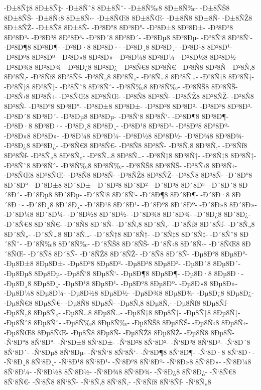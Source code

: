 {-Ð±8Ñ‡8
8Ð±8Ñ‡-
-Ð±8Ñˆ8
8Ð±8Ñˆ-
-Ð±8Ñ‰8
8Ð±8Ñ‰-
-Ð±8ÑŠ8
8Ð±8ÑŠ-
-Ð±8Ñ‹8
8Ð±8Ñ‹-
-Ð±8ÑŒ8
8Ð±8ÑŒ-
-Ð±8Ñ8
8Ð±8Ñ-
-Ð±8ÑŽ8
8Ð±8ÑŽ-
-Ð±8Ñ8
8Ð±8Ñ-
-Ð²8Ð°8
8Ð²8Ð°-
-Ð²8Ð±8
8Ð²8Ð±-
-Ð²8Ð²8
8Ð²8Ð²-
-Ð²8Ð³8
8Ð²8Ð³-
-Ð²8Ð´8
8Ð²8Ð´-
-Ð²8Ðµ8
8Ð²8Ðµ-
-Ð²8Ñ‘8
8Ð²8Ñ‘-
-Ð²8Ð¶8
8Ð²8Ð¶-
-Ð²8Ð·8
8Ð²8Ð·-
-Ð²8Ð¸8
8Ð²8Ð¸-
-Ð²8Ð¹8
8Ð²8Ð¹-
-Ð²8Ðº8
8Ð²8Ðº-
-Ð²8Ð»8
8Ð²8Ð»-
-Ð²8Ð¼8
8Ð²8Ð¼-
-Ð²8Ð½8
8Ð²8Ð½-
-Ð²8Ð¾8
8Ð²8Ð¾-
-Ð²8Ð¿8
8Ð²8Ð¿-
-Ð²8Ñ€8
8Ð²8Ñ€-
-Ð²8Ñ8
8Ð²8Ñ-
-Ð²8Ñ‚8
8Ð²8Ñ‚-
-Ð²8Ñƒ8
8Ð²8Ñƒ-
-Ð²8Ñ„8
8Ð²8Ñ„-
-Ð²8Ñ…8
8Ð²8Ñ…-
-Ð²8Ñ†8
8Ð²8Ñ†-
-Ð²8Ñ‡8
8Ð²8Ñ‡-
-Ð²8Ñˆ8
8Ð²8Ñˆ-
-Ð²8Ñ‰8
8Ð²8Ñ‰-
-Ð²8ÑŠ8
8Ð²8ÑŠ-
-Ð²8Ñ‹8
8Ð²8Ñ‹-
-Ð²8ÑŒ8
8Ð²8ÑŒ-
-Ð²8Ñ8
8Ð²8Ñ-
-Ð²8ÑŽ8
8Ð²8ÑŽ-
-Ð²8Ñ8
8Ð²8Ñ-
-Ð³8Ð°8
8Ð³8Ð°-
-Ð³8Ð±8
8Ð³8Ð±-
-Ð³8Ð²8
8Ð³8Ð²-
-Ð³8Ð³8
8Ð³8Ð³-
-Ð³8Ð´8
8Ð³8Ð´-
-Ð³8Ðµ8
8Ð³8Ðµ-
-Ð³8Ñ‘8
8Ð³8Ñ‘-
-Ð³8Ð¶8
8Ð³8Ð¶-
-Ð³8Ð·8
8Ð³8Ð·-
-Ð³8Ð¸8
8Ð³8Ð¸-
-Ð³8Ð¹8
8Ð³8Ð¹-
-Ð³8Ðº8
8Ð³8Ðº-
-Ð³8Ð»8
8Ð³8Ð»-
-Ð³8Ð¼8
8Ð³8Ð¼-
-Ð³8Ð½8
8Ð³8Ð½-
-Ð³8Ð¾8
8Ð³8Ð¾-
-Ð³8Ð¿8
8Ð³8Ð¿-
-Ð³8Ñ€8
8Ð³8Ñ€-
-Ð³8Ñ8
8Ð³8Ñ-
-Ð³8Ñ‚8
8Ð³8Ñ‚-
-Ð³8Ñƒ8
8Ð³8Ñƒ-
-Ð³8Ñ„8
8Ð³8Ñ„-
-Ð³8Ñ…8
8Ð³8Ñ…-
-Ð³8Ñ†8
8Ð³8Ñ†-
-Ð³8Ñ‡8
8Ð³8Ñ‡-
-Ð³8Ñˆ8
8Ð³8Ñˆ-
-Ð³8Ñ‰8
8Ð³8Ñ‰-
-Ð³8ÑŠ8
8Ð³8ÑŠ-
-Ð³8Ñ‹8
8Ð³8Ñ‹-
-Ð³8ÑŒ8
8Ð³8ÑŒ-
-Ð³8Ñ8
8Ð³8Ñ-
-Ð³8ÑŽ8
8Ð³8ÑŽ-
-Ð³8Ñ8
8Ð³8Ñ-
-Ð´8Ð°8
8Ð´8Ð°-
-Ð´8Ð±8
8Ð´8Ð±-
-Ð´8Ð²8
8Ð´8Ð²-
-Ð´8Ð³8
8Ð´8Ð³-
-Ð´8Ð´8
8Ð´8Ð´-
-Ð´8Ðµ8
8Ð´8Ðµ-
-Ð´8Ñ‘8
8Ð´8Ñ‘-
-Ð´8Ð¶8
8Ð´8Ð¶-
-Ð´8Ð·8
8Ð´8Ð·-
-Ð´8Ð¸8
8Ð´8Ð¸-
-Ð´8Ð¹8
8Ð´8Ð¹-
-Ð´8Ðº8
8Ð´8Ðº-
-Ð´8Ð»8
8Ð´8Ð»-
-Ð´8Ð¼8
8Ð´8Ð¼-
-Ð´8Ð½8
8Ð´8Ð½-
-Ð´8Ð¾8
8Ð´8Ð¾-
-Ð´8Ð¿8
8Ð´8Ð¿-
-Ð´8Ñ€8
8Ð´8Ñ€-
-Ð´8Ñ8
8Ð´8Ñ-
-Ð´8Ñ‚8
8Ð´8Ñ‚-
-Ð´8Ñƒ8
8Ð´8Ñƒ-
-Ð´8Ñ„8
8Ð´8Ñ„-
-Ð´8Ñ…8
8Ð´8Ñ…-
-Ð´8Ñ†8
8Ð´8Ñ†-
-Ð´8Ñ‡8
8Ð´8Ñ‡-
-Ð´8Ñˆ8
8Ð´8Ñˆ-
-Ð´8Ñ‰8
8Ð´8Ñ‰-
-Ð´8ÑŠ8
8Ð´8ÑŠ-
-Ð´8Ñ‹8
8Ð´8Ñ‹-
-Ð´8ÑŒ8
8Ð´8ÑŒ-
-Ð´8Ñ8
8Ð´8Ñ-
-Ð´8ÑŽ8
8Ð´8ÑŽ-
-Ð´8Ñ8
8Ð´8Ñ-
-Ðµ8Ð°8
8Ðµ8Ð°-
-Ðµ8Ð±8
8Ðµ8Ð±-
-Ðµ8Ð²8
8Ðµ8Ð²-
-Ðµ8Ð³8
8Ðµ8Ð³-
-Ðµ8Ð´8
8Ðµ8Ð´-
-Ðµ8Ðµ8
8Ðµ8Ðµ-
-Ðµ8Ñ‘8
8Ðµ8Ñ‘-
-Ðµ8Ð¶8
8Ðµ8Ð¶-
-Ðµ8Ð·8
8Ðµ8Ð·-
-Ðµ8Ð¸8
8Ðµ8Ð¸-
-Ðµ8Ð¹8
8Ðµ8Ð¹-
-Ðµ8Ðº8
8Ðµ8Ðº-
-Ðµ8Ð»8
8Ðµ8Ð»-
-Ðµ8Ð¼8
8Ðµ8Ð¼-
-Ðµ8Ð½8
8Ðµ8Ð½-
-Ðµ8Ð¾8
8Ðµ8Ð¾-
-Ðµ8Ð¿8
8Ðµ8Ð¿-
-Ðµ8Ñ€8
8Ðµ8Ñ€-
-Ðµ8Ñ8
8Ðµ8Ñ-
-Ðµ8Ñ‚8
8Ðµ8Ñ‚-
-Ðµ8Ñƒ8
8Ðµ8Ñƒ-
-Ðµ8Ñ„8
8Ðµ8Ñ„-
-Ðµ8Ñ…8
8Ðµ8Ñ…-
-Ðµ8Ñ†8
8Ðµ8Ñ†-
-Ðµ8Ñ‡8
8Ðµ8Ñ‡-
-Ðµ8Ñˆ8
8Ðµ8Ñˆ-
-Ðµ8Ñ‰8
8Ðµ8Ñ‰-
-Ðµ8ÑŠ8
8Ðµ8ÑŠ-
-Ðµ8Ñ‹8
8Ðµ8Ñ‹-
-Ðµ8ÑŒ8
8Ðµ8ÑŒ-
-Ðµ8Ñ8
8Ðµ8Ñ-
-Ðµ8ÑŽ8
8Ðµ8ÑŽ-
-Ðµ8Ñ8
8Ðµ8Ñ-
-Ñ‘8Ð°8
8Ñ‘8Ð°-
-Ñ‘8Ð±8
8Ñ‘8Ð±-
-Ñ‘8Ð²8
8Ñ‘8Ð²-
-Ñ‘8Ð³8
8Ñ‘8Ð³-
-Ñ‘8Ð´8
8Ñ‘8Ð´-
-Ñ‘8Ðµ8
8Ñ‘8Ðµ-
-Ñ‘8Ñ‘8
8Ñ‘8Ñ‘-
-Ñ‘8Ð¶8
8Ñ‘8Ð¶-
-Ñ‘8Ð·8
8Ñ‘8Ð·-
-Ñ‘8Ð¸8
8Ñ‘8Ð¸-
-Ñ‘8Ð¹8
8Ñ‘8Ð¹-
-Ñ‘8Ðº8
8Ñ‘8Ðº-
-Ñ‘8Ð»8
8Ñ‘8Ð»-
-Ñ‘8Ð¼8
8Ñ‘8Ð¼-
-Ñ‘8Ð½8
8Ñ‘8Ð½-
-Ñ‘8Ð¾8
8Ñ‘8Ð¾-
-Ñ‘8Ð¿8
8Ñ‘8Ð¿-
-Ñ‘8Ñ€8
8Ñ‘8Ñ€-
-Ñ‘8Ñ8
8Ñ‘8Ñ-
-Ñ‘8Ñ‚8
8Ñ‘8Ñ‚-
-Ñ‘8Ñƒ8
8Ñ‘8Ñƒ-
-Ñ‘8Ñ„8
}
